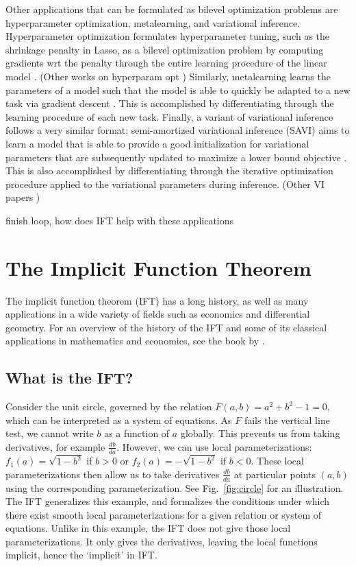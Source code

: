 \documentclass[11pt]{article}
\begin{document}
Other applications that can be formulated as bilevel optimization problems are
hyperparameter optimization, metalearning, and variational inference.
Hyperparameter optimization formulates hyperparameter tuning, such as the shrinkage penalty in Lasso,
as a bilevel optimization problem by computing gradients wrt the penalty through the entire learning procedure
of the linear model \citep{lorraine2019implasso}.
(Other works on hyperparam opt \citep{maclaurin2015reversible,bertrand2020implicit})
Similarly, metalearning learns the parameters of a model such that the model is able to quickly
be adapted to a new task via gradient descent \citep{finn2017maml,rajeswaran2019imaml}.
This is accomplished by differentiating through the learning procedure of each new task.
Finally, a variant of variational inference follows a very similar format:
semi-amortized variational inference (SAVI) aims to learn a model that is able to provide
a good initialization for variational parameters that are subsequently updated
to maximize a lower bound objective \citep{kim2018savi}.
This is also accomplished by differentiating through the iterative optimization procedure
applied to the variational parameters during inference.
(Other VI papers \citep{vi,johnson2017pgm})

{\color{red} finish loop, how does IFT help with these applications}

\section{The Implicit Function Theorem}
The implicit function theorem (IFT) has a long history, as well as many applications
in a wide variety of fields such as economics and differential geometry.
For an overview of the history of the IFT and some of its classical applications
in mathematics and economics,
see the book by \citet{iftbook}.

\subsection{What is the IFT?}
Consider the unit circle,
governed by the relation $F(a,b) = a^2 + b^2 - 1 = 0$,
which can be interpreted as a system of equations.
As $F$ fails the vertical line test, we cannot write $b$ as a function of $a$ globally.
This prevents us from taking derivatives, for example $\frac{db}{da}$.
However, we can use local parameterizations: $f_1(a) = \sqrt{1-b^2}$ if $b > 0$
or $f_2(a) = -\sqrt{1-b^2}$ if $b<0$.
These local parameterizations then allow us to take derivatives $\frac{db}{da}$
at particular points $(a,b)$ using the corresponding parameterization.
See Fig.~\ref{fig:circle} for an illustration.
The IFT generalizes this example, and formalizes the conditions under which there exist
smooth local parameterizations for a given relation or system of equations.
Unlike in this example, the IFT does not give those local parameterizations.
It only gives the derivatives, leaving the local functions implicit,
hence the `implicit' in IFT.
\end{document}
